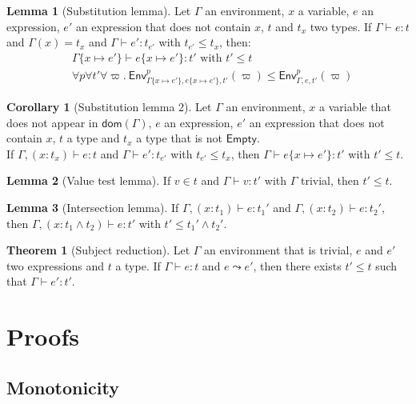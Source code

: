 \documentclass[a4paper]{article}%
\newcommand{\dom}[1]{\textsf{dom}(#1)}
\newcommand{\Empty} {\textsf{Empty}}%
\newcommand{\subst}[2]{\{#1 \mapsto #2\}}
\newcommand{\Gp}[2]{\textsf{Env}^{#1}_{#2}}
\theoremstyle{definition}
\newtheorem{theorem}{Theorem}
\newtheorem{lemma}{Lemma}
\newtheorem{corollary}{Corollary}
\begin{document}
    \begin{lemma}[Substitution lemma]
      Let $\Gamma$ an environment, $x$ a variable, $e$ an expression, $e'$ an expression that does not contain $x$, $t$ and $t_x$ two types.
      If $\Gamma \vdash e:t$ and $\Gamma(x) = t_x$ and $\Gamma \vdash e':t_{e'}$ with $t_{e'} \leq t_x$, then:
      \begin{align*}
        &\Gamma \subst x {e'} \vdash e \subst x {e'}:t' \text{ with } t'\leq t\\
        &\forall p \forall t' \forall \varpi.\ \Gp p {\Gamma\subst x {e'},e\subst x {e'},t'} (\varpi) \leq \Gp p {\Gamma,e,t'} (\varpi)
      \end{align*}
    \end{lemma}

    \begin{corollary}[Substitution lemma 2]
      Let $\Gamma$ an environment, $x$ a variable that does not appear in $\dom \Gamma$, $e$ an expression, $e'$ an expression that does not contain $x$, $t$ a type and $t_x$ a type that is not $\Empty$.\\
      If $\Gamma, (x:t_x) \vdash e:t$ and $\Gamma \vdash e':t_{e'}$ with $t_{e'} \leq t_x$, then $\Gamma \vdash e \subst x {e'}:t'$ with $t'\leq t$.
    \end{corollary}

    \begin{lemma}[Value test lemma]
      If $v \in t$ and $\Gamma \vdash v : t'$ with $\Gamma$ trivial, then $t' \leq t$.
    \end{lemma}

    \begin{lemma}[Intersection lemma]
      If $\Gamma, (x:t_1) \vdash e:t_1'$ and $\Gamma, (x:t_2) \vdash e:t_2'$, then $\Gamma, (x:t_1\land t_2) \vdash e:t'$ with $t' \leq t_1'\land t_2'$.
    \end{lemma}

    \begin{theorem}[Subject reduction]
      Let $\Gamma$ an environment that is trivial, $e$ and $e'$ two expressions and $t$ a type.
      If $\Gamma \vdash e : t$ and $e \leadsto e'$, then there exists $t' \leq t$ such that $\Gamma \vdash e' : t'$.
    \end{theorem}

    \section{Proofs}

    \subsection{Monotonicity}
\end{document}
